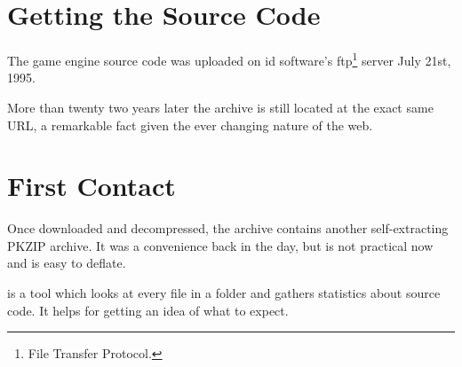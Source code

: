 \documentclass[book.tex]{subfiles}
\begin{document}
\section{Getting the Source Code}
The game engine source code was uploaded on id software's ftp\footnote{File Transfer Protocol.} server July 21st, 1995.\\ 
\par
\begin{minipage}{\textwidth}

\end{minipage}
\par
More than twenty two years later the archive is still located at the exact same URL, a remarkable fact given the ever changing nature of the web.\\

\section{First Contact}
Once downloaded and decompressed, the archive  contains another self-extracting PKZIP archive. It was a convenience back in the day, but is not practical now and is easy to deflate.\\
\par
\begin{minipage}{\textwidth}

\end{minipage}

\par
{} is a tool which looks at every file in a folder and gathers statistics about source code. It helps for getting an idea of what to expect.\\
\par

\begin{minipage}{\textwidth}

\end{minipage}
\end{document}

